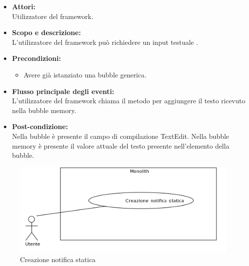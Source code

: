 \begin{itemize}
	\item \textbf{Attori:}
	\\Utilizzatore del framework.
	\item \textbf{Scopo e descrizione:} 
	\\L'utilizzatore del framework può richiedere un input testuale .
	\item \textbf{Precondizioni:}
	\begin{itemize}
		\item Avere già istanziato una bubble generica.
	\end{itemize}
	\item \textbf{Flusso principale degli eventi:}
	\\L'utilizzatore del framework chiama il metodo per aggiungere il testo ricevuto nella bubble memory.
	\item \textbf{Post-condizione:}
	\\Nella bubble è presente il campo di compilazione TextEdit. Nella bubble memory è presente il valore attuale del testo presente nell'elemento della bubble.
\end{itemize}


\begin{figure}[H]
	\centering
	\includegraphics[width=15cm]{../../documenti/AnalisiDeiRequisiti/Diagrammi_img/uc1_17.png}
	\caption{\UCCaption{} Creazione notifica statica}
\end{figure}

